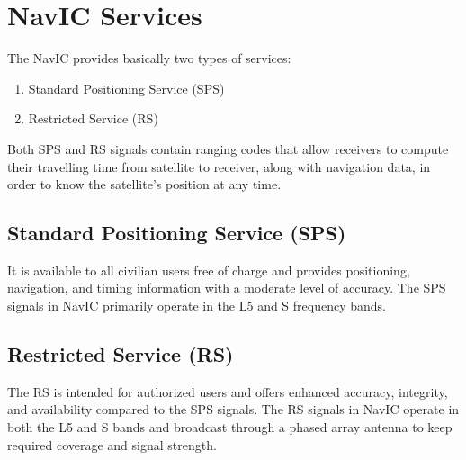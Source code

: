 \section{NavIC Services}
The NavIC provides basically two types of services:
	\begin{enumerate}
	\item Standard Positioning Service (SPS)
	\item Restricted Service (RS)
	\end{enumerate}
Both SPS and RS signals contain ranging codes that allow receivers to compute their travelling time from satellite to receiver, along with navigation data, in order to know the satellite’s position at any time. 
\subsection{Standard Positioning Service (SPS)}
	It is available to all civilian users free of charge and provides positioning, navigation, and timing information with a moderate level of accuracy. The SPS signals in NavIC primarily operate in the L5 and S frequency bands.
\subsection{Restricted Service (RS)}
The RS is intended for authorized users and offers enhanced accuracy, integrity, and availability compared to the SPS signals. The RS signals in NavIC operate in both the L5 and S bands and broadcast through a phased array antenna to keep required coverage and signal strength. 
\let\cleardoublepage\clearpage  %
%
